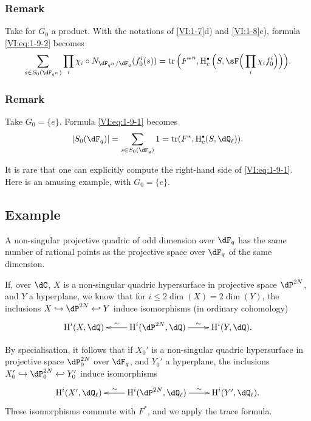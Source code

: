 \addtocounter{subsubsection}{2}
\subsubsection{Remark}\label{VI:1-9-3}

Take for $G_0$ a product. With the notations of \ref{VI:1-7}d) and
\ref{VI:1-8}c), formula \eqref{VI:eq:1-9-2} becomes 
\[
  \sum_{s\in S_0(\dF_{q^n})} \prod_i \chi_i\circ N_{\dF_{q^n}/\dF_q} (f_0^i(s)) = \tr\Big({F^\ast}^n, \h_c^\bullet\Big(S,\sF\Big(\prod_i \chi_i f_0^i\Big)\Big)\Big) \text{.}
\]





\subsubsection{Remark}\label{VI:1-9-4}

Take $G_0=\{e\}$. Formula \eqref{VI:eq:1-9-1} becomes 
\[
  \left|S_0(\dF_q)\right| = \sum_{s\in S_0(\dF_q)} 1 = \tr(F^\ast,\h_c^\bullet(S,\dQ_\ell)) \text{.}
\]

It is rare that one can explicitly compute the right-hand side of
\eqref{VI:eq:1-9-1}. Here is an amusing example, with $G_0=\{e\}$. 





\subsection{Example}\label{VI:1-10}

A non-singular projective quadric of odd dimension over \texorpdfstring{$\dF_q$}{Fq} has the same number of rational points as the projective space over \texorpdfstring{$\dF_q$}{Fq} of the same dimension.

If, over $\dC$, $X$ is a non-singular quadric hypersurface in
projective space $\dP^{2 N}$, and $Y$ a hyperplane, we know that for
$i\leqslant 2\dim(X)=2\dim(Y)$, the inclusions 
$X\hookrightarrow \dP^{2 N}\hookleftarrow Y$ induce isomorphisms (in
ordinary cohomology) 
\[\xymatrix{
  \h^i(X,\dQ) 
    & \ar[l]_-\sim \h^i(\dP^{2 N},\dQ) \ar[r]^-\sim 
    & \h^i(Y,\dQ) \text{.}
}\]

By specialisation, it follows that if $X_0'$ is a non-singular
quadric hypersurface in projective space $\dP_0^{2 N}$ over $\dF_q$,
and $Y_0'$ a hyperplane, the inclusions
$X_0'\hookrightarrow \dP_0^{2 N}\hookleftarrow Y_0'$ induce
isomorphisms 
\[\xymatrix{
  \h^i(X',\dQ_\ell) 
    & \ar[l]_-\sim \h^i(\dP^{2 N},\dQ_\ell) \ar[r]^-\sim 
    & \h^i(Y',\dQ_\ell) \text{.}
}\]
These isomorphisms commute with $F^\ast$, and we apply the trace formula. 






